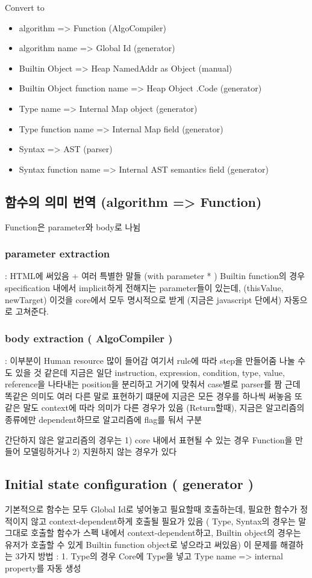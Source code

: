 Convert to
\begin{itemize}
\item algorithm => Function (AlgoCompiler)
\item algorithm name => Global Id (generator)
\item Builtin Object => Heap NamedAddr as Object (manual)
\item Builtin Object function name => Heap Object .Code (generator)
\item Type name => Internal Map object (generator)
\item Type function name => Internal Map field (generator)
\item Syntax => AST (parser)
\item Syntax function name => Internal AST semantics field (generator)
\end{itemize}

\subsection{함수의 의미 번역 (algorithm => Function)}
Function은 parameter와 body로 나뉨
\subsubsection{parameter extraction} : HTML에 써있음 + 여러 특별한 말들 (with parameter * )
Builtin function의 경우 specification 내에서 implicit하게 전해지는 parameter들이 있는데, (thisValue, newTarget) 이것을
core에서 모두 명시적으로 받게 (지금은 javascript 단에서) 자동으로 고쳐준다.

\subsubsection{body extraction ( AlgoCompiler )} : 이부분이 Human resource 많이 들어감
여기서 rule에 따라 step을 만들어줌
나눌 수도 있을 것 같은데 지금은 일단 instruction, expression, condition, type, value, reference을 나타내는 position을 분리하고 거기에 맞춰서 case별로 parser를 짬
근데 똑같은 의미도 여러 다른 말로 표현하기 떄문에 지금은 모든 경우를 하나씩 써놓음
또 같은 말도 context에 따라 의미가 다른 경우가 있음 (Return할때), 지금은 알고리즘의 종류에만 dependent하므로 알고리즘에 flag를 둬서 구분

간단하지 않은 알고리즘의 경우는 1) core 내에서 표현될 수 있는 경우 Function을 만들어 모델링하거나 
2) 지원하지 않는 경우가 있다

\subsection{ Initial state configuration ( generator ) }
기본적으로 함수는 모두 Global Id로 넣어놓고 필요할때 호출하는데, 필요한 함수가 정적이지 않고
context-dependent하게 호출될 필요가 있음 ( Type, Syntax의 경우는 말 그대로 호출할 함수가
스펙 내에서 context-dependent하고, Builtin object의 경우는 유저가 호출할 수 있게 Builtin function object로 넣으라고 써있음) 이 문제를 해결하는 3가지 방법 :
1. Type의 경우 Core에 Type을 넣고 Type name => internal property를 자동 생성

